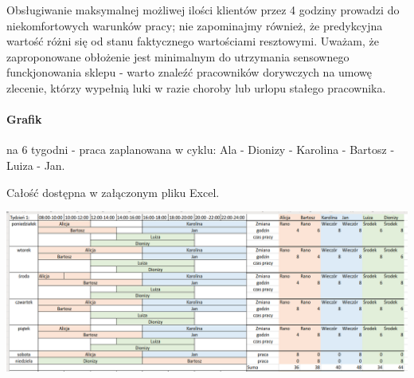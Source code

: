 \documentclass[a4paper,11pt]{article}
\begin{document}
Obsługiwanie maksymalnej możliwej ilości klientów przez 4 godziny prowadzi do niekomfortowych warunków pracy;  nie zapominajmy również, że predykcyjna wartość różni się od stanu faktycznego wartościami resztowymi. Uważam, że zaproponowane obłożenie jest minimalnym do utrzymania sensownego funckjonowania sklepu - warto  znaleźć pracowników dorywczych na umowę zlecenie, którzy wypełnią luki w razie choroby lub urlopu stałego pracownika. 

\paragraph{Grafik} na 6 tygodni - praca zaplanowana w cyklu: Ala - Dionizy - Karolina - Bartosz - Luiza - Jan.

Całość dostępna w załączonym pliku Excel. 
\begin{center}

\includegraphics[scale=.48, angle =  90]{93547771_2313519675615944_2694907324711043072_n.png} 

\end{center}
\end{document}
